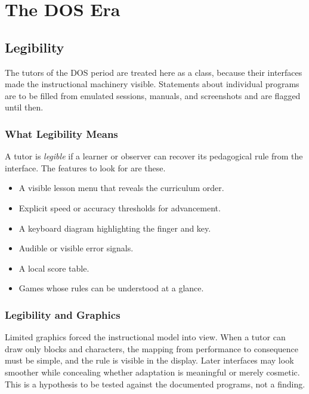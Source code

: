 \part{The DOS Era}

\chapter{Legibility}

The tutors of the DOS period are treated here as a class, because their interfaces made the instructional machinery visible. Statements about individual programs are to be filled from emulated sessions, manuals, and screenshots and are flagged until then. 

\section{What Legibility Means}

A tutor is \emph{legible} if a learner or observer can recover its pedagogical rule from the interface. The features to look for are these.

\begin{itemize}
\item A visible lesson menu that reveals the curriculum order.
\item Explicit speed or accuracy thresholds for advancement.
\item A keyboard diagram highlighting the finger and key.
\item Audible or visible error signals.
\item A local score table.
\item Games whose rules can be understood at a glance.
\end{itemize}

\section{Legibility and Graphics}

Limited graphics forced the instructional model into view. When a tutor can draw only blocks and characters, the mapping from performance to consequence must be simple, and the rule is visible in the display. Later interfaces may look smoother while concealing whether adaptation is meaningful or merely cosmetic. This is a hypothesis to be tested against the documented programs, not a finding.

